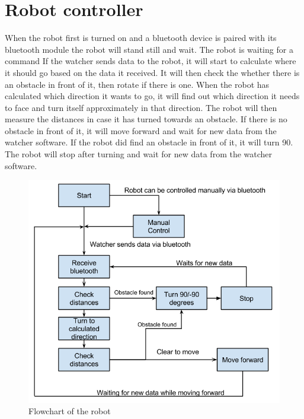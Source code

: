 \section{Robot controller}
When the robot first is turned on and a bluetooth device is paired with its bluetooth module the robot will stand still and wait. The robot is waiting for a command
If the watcher sends data to the robot, it will start to calculate where it should go based on the data it received. 
It will then check the whether there is an obstacle in front of it, then rotate if there is one. 
When the robot has calculated which direction it wants to go, it will find out which direction it needs to face and turn itself approximately in that direction. The robot will then measure the distances in case it has turned towards an obstacle. If there is no obstacle in front of it, it will move forward and wait for new data from the watcher software. If the robot did find an obstacle in front of it, it will turn 90\textdegree. The robot will stop after turning and wait for new data from the watcher software. 
\begin{figure}[h!]
\begin{center}
\includegraphics[width=0.8\linewidth]{figs/robotschema}
\end{center}
\caption[Robot flowchart]{Flowchart of the robot}
\label{fig:robotschema}
\end{figure}

